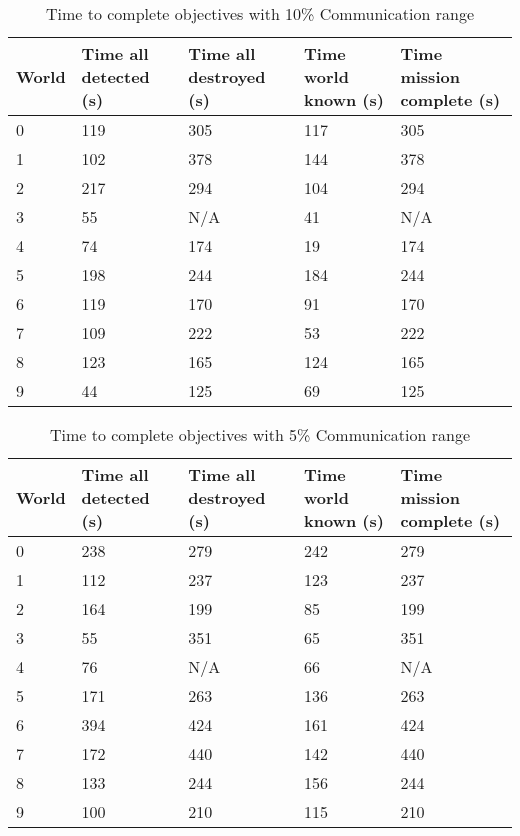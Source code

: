 \begin{table}[H]
	\caption{Time to complete objectives with 10\% Communication range}
	\centering
	\label{tab:comm10}
	
	\begin{tabular}{|p{1cm}|p{1.5cm}|p{1.75cm}|p{1.5cm}|p{1.5cm}|}
		\hline
		World & Time all detected (s) & Time all destroyed (s) & Time world known (s) & Time mission complete (s) \\
		\hline
		0&119&305&117&305 \\ \hline
		1&102&378&144&378 \\ \hline
		2&217&294&104&294 \\ \hline
		3&55&N/A&41&N/A\\ \hline
		4&74&174&19&174 \\ \hline
		5&198&244&184&244 \\ \hline
		6&119&170&91&170 \\ \hline
		7&109&222&53&222 \\ \hline
		8&123&165&124&165 \\ \hline
		9&44&125&69&125 \\ \hline

	\end{tabular}
\end{table}


\begin{table}[H]
	\caption{Time to complete objectives with 5\% Communication range}
	\centering
	\label{tab:comm5}
	
	\begin{tabular}{|p{1cm}|p{1.5cm}|p{1.75cm}|p{1.5cm}|p{1.5cm}|}
		\hline
		World & Time all detected (s) & Time all destroyed (s) & Time world known (s) & Time mission complete (s) \\
		\hline
		0&238&279&242&279 \\ \hline
		1&112&237&123&237 \\ \hline
		2&164&199&85&199 \\ \hline
		3&55&351&65&351 \\ \hline
		4&76& N/A &66& N/A\\ \hline
		5&171&263&136&263 \\ \hline
		6&394&424&161&424 \\ \hline
		7&172&440&142&440 \\ \hline
		8&133&244&156&244 \\ \hline
		9&100&210&115&210 \\ \hline
	\end{tabular}
\end{table}


